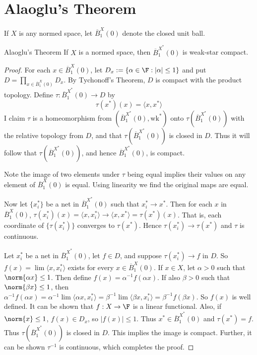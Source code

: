 \section{Alaoglu's Theorem}
\label{sec:Alaoglu}

If $X$ is any normed space, let $\overline{B}_1^X(0)$ denote the closed unit ball.

\begin{nthm}{Alaoglu's Theorem}
    If $X$ is a normed space, then $\overline{B}_1^{X^*}(0)$ is weak-star compact.
\end{nthm}
\begin{proof}
    For each $x \in \overline{B}_1^X(0)$, let $D_x := \{\alpha \in \F:|\alpha| \leq 1\}$ and put $D = \prod_{x \in \overline{B}_1^X(0)}D_x$. By Tychonoff's Theorem, $D$ is compact with the product topology. Define $\tau:\overline{B}_1^{X^*}(0)\rightarrow D$ by $$\tau(x^*)(x) = \langle x,x^*\rangle$$
    I claim $\tau$ is a homeomorphism from $(\overline{B}_1^{X^*}(0),\text{wk}^*)$ onto $\tau(\overline{B}_1^{X^*}(0))$ with the relative topology from $D$, and that $\tau(\overline{B}_1^{X^*}(0))$ is closed  in $D$. Thus it will follow that $\tau(\overline{B}_1^{X^*}(0))$, and hence $\overline{B}_1^{X^*}(0)$, is compact.

    Note the image of two elements under $\tau$ being equal implies their values on any element of $\overline{B}_1^X(0)$ is equal. Using linearity we find the original maps are equal.

    Now let $\{x_i^*\}$ be a net in $\overline{B}_1^{X^*}(0)$ such that $x_i^*\rightarrow x^*$. Then for each $x$ in $\overline{B}_1^X(0)$, $\tau(x_i^*)(x) = \langle x,x_i^*\rangle\rightarrow \langle x,x^*\rangle = \tau(x^*)(x)$. That is, each coordinate of $\{\tau(x_i^*)\}$ converges to $\tau(x^*)$. Hence $\tau(x_i^*)\rightarrow \tau(x^*)$ and $\tau$ is continuous. 

    Let $x_i^*$ be a net in $\overline{B}_1^{X^*}(0)$, let $f \in D$, and suppose $\tau(x_i^*)\rightarrow f$ in $D$. So $f(x) = \lim\langle x,x_i^*\rangle$ exists for every $x \in \overline{B}_1^X(0)$. If $x \in X$, let $\alpha > 0$ such that $\norm{\alpha x}\leq 1$. Then define $f(x) = \alpha^{-1}f(\alpha x)$. If also $\beta > 0$ such that $\norm{\beta x} \leq 1$, then $\alpha^{-1}f(\alpha x) = \alpha^{-1}\lim\langle \alpha x,x_i^*\rangle = \beta^{-1}\lim\langle \beta x,x_i^*\rangle = \beta^{-1}f(\beta x)$. So $f(x)$ is well defined.  It can be shown that $f:X\rightarrow \F$ is a linear functional. Also, if $\norm{x} \leq 1$, $f(x) \in D_x$, so $|f(x)| \leq 1$. Thus $x^* \in \overline{B}_1^{X^*}(0)$ and $\tau(x^*) = f$. Thus $\tau(\overline{B}_1^{X^*}(0))$ is closed in $D$. This implies the image is compact. Further, it can be shown $\tau^{-1}$ is continuous, which completes the proof.
\end{proof}




